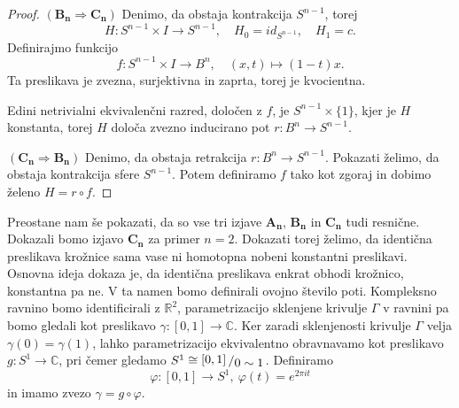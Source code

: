 \documentclass[10pt, a4paper]{article}
\newenvironment{noticeC}{%
  \tcolorbox[%
  notitle,
  empty,
  enhanced,  %
  breakable,
  coltext=black, 
  fontupper=\rmfamily,
  noparskip,
  sharp corners,
  boxrule=-1pt,  %
  frame hidden,
  left=7pt,  %
  right=7pt,
  top=5pt,
  bottom=5pt,
  before skip=2.5ex plus 2pt,
  after skip=2.5ex plus 2pt,
  overlay unbroken and last={%
  },
  ]}
{\endtcolorbox}
\newenvironment{dokaz}%
  {\begin{noticeC}\begin{proof}}%
  {\end{proof}\end{noticeC}}
\newcommand{\R}{\mathbb {R}}
\newcommand{\C}{\mathbb {C}}
\newcommand{\quot}[2]{{\raisebox{0.1em}{$#1$}\left/\raisebox{-0.2em}{$#2$}\right.}}
\begin{document}
\begin{dokaz}
  $(\mathbf{B_n} \Rightarrow \mathbf{C_n})$ Denimo, da obstaja kontrakcija $S^{n - 1}$,
  torej $$H : S^{n - 1} \times I \to S^{n - 1},\quad H_0 = id_{S^{n -1}},\quad H_1 = c.$$
  Definirajmo funkcijo 
  $$f: S^{n - 1} \times I \to B^n,\quad (x, t) \mapsto (1-t)x.$$
  Ta preslikava je zvezna, surjektivna in zaprta, torej je kvocientna.
  \begin{center}
  \end{center}  
  Edini netrivialni ekvivalenčni razred, določen z $f$, je $S^{n -1} \times \{1\}$, kjer je $H$ 
  konstanta, torej $H$ določa zvezno inducirano pot $r: B^n \to S^{n -1}$.
  \begin{center}
  \end{center} 
  $(\mathbf{C_n} \Rightarrow \mathbf{B_n})$ Denimo, da obstaja retrakcija $r: B^n \to S^{n - 1}$.
  Pokazati želimo, da obstaja kontrakcija sfere $S^{n - 1}$. Potem definiramo $f$ tako kot zgoraj 
  in dobimo želeno $H = r \circ f$.
\end{dokaz}

Preostane nam še pokazati, da so vse tri izjave $\mathbf{A_n}$, $\mathbf{B_n}$ in $\mathbf{C_n}$ tudi resnične.
Dokazali bomo izjavo $\mathbf{C_n}$ za primer $n = 2$.
Dokazati torej želimo, da identična preslikava krožnice sama vase ni 
homotopna nobeni konstantni preslikavi. Osnovna ideja dokaza je, da 
identična preslikava enkrat obhodi krožnico, konstantna pa ne.
V ta namen bomo definirali ovojno število poti. Kompleksno ravnino bomo identificirali 
z $\R^2$, parametrizacijo sklenjene krivulje $\Gamma$ v ravnini 
pa bomo gledali kot preslikavo $\gamma : [0, 1] \to \C$.
Ker zaradi sklenjenosti krivulje $\Gamma$ velja $\gamma(0) = \gamma (1)$, lahko parametrizacijo 
ekvivalentno obravnavamo kot preslikavo $g: S^1 \to \C$, pri čemer gledamo $S^1 \cong \quot{[0, 1]}{0 \sim 1}$.
Definiramo $$\varphi: [0, 1] \to S^1,\ \varphi(t) = e^{2 \pi i t}$$
in imamo zvezo $\gamma = g \circ \varphi$.
\end{document}
